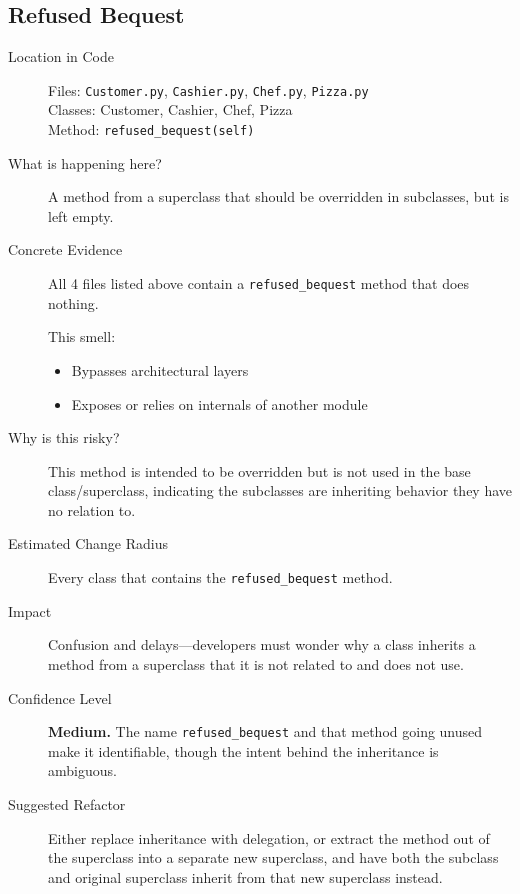 \documentclass[12pt]{article}
\begin{document}
\subsection{Refused Bequest}

\begin{description}
    \item[Location in Code]
        Files: \texttt{Customer.py}, \texttt{Cashier.py}, \texttt{Chef.py}, \texttt{Pizza.py} \\
        Classes: Customer, Cashier, Chef, Pizza \\
        Method: \texttt{refused\_bequest(self)}

    \item[What is happening here?]
        A method from a superclass that should be overridden in subclasses, but is left empty.

    \item[Concrete Evidence]
        All 4 files listed above contain a \texttt{refused\_bequest} method that does nothing.

        This smell:
        \begin{itemize}
            \item Bypasses architectural layers
            \item Exposes or relies on internals of another module
        \end{itemize}

    \item[Why is this risky?]
        This method is intended to be overridden but is not used in the base class/superclass,
        indicating the subclasses are inheriting behavior they have no relation to.

    \item[Estimated Change Radius]
        Every class that contains the \texttt{refused\_bequest} method.

    \item[Impact]
        Confusion and delays---developers must wonder why a class inherits a method from a
        superclass that it is not related to and does not use.

    \item[Confidence Level]
        \textbf{Medium.} The name \texttt{refused\_bequest} and that method going unused make it
        identifiable, though the intent behind the inheritance is ambiguous.

    \item[Suggested Refactor]
        Either replace inheritance with delegation, or extract the method out of the superclass
        into a separate new superclass, and have both the subclass and original superclass
        inherit from that new superclass instead.
\end{description}
\end{document}
